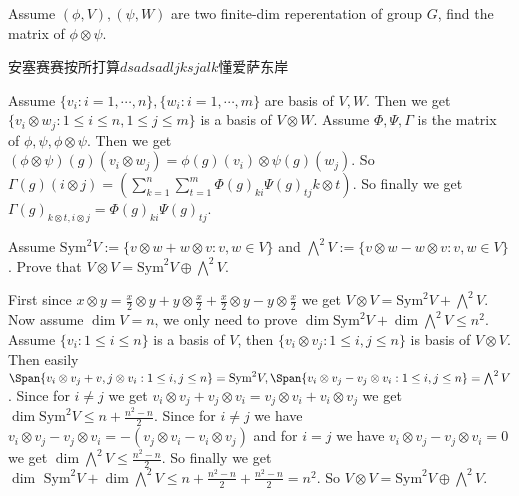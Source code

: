\documentclass{ctexart}
\newif\ifpreface
\begin{document}
\large
\setlength{\baselineskip}{1.2em}
\ifpreface
	
	\newgeometry{left=2cm,right=2cm,top=2cm,bottom=2cm}
\else
	\maketitle
\fi
\begin{problem}
Assume \((\phi,V),(\psi,W)\) are two finite-dim reperentation of group \(G\), find the matrix of \(\phi \otimes \psi\).
\end{problem}

安塞赛赛按所打算\(dsadsadljksjalk\)懂爱萨东岸\(\)\(\)\(\)\(\)
\begin{solution}
	Assume \(\{ v_i:i=1,\cdots,n\},\{ w_i:i=1,\cdots ,m\}\) are basis of \(V,W\). Then we get \(\{ v_i \otimes w_j:1 \leq i \leq n,1 \leq j \leq m\}\) is a basis of \(V \otimes W\).
	Assume \(\Phi,\Psi,\Gamma\) is the matrix of \(\phi,\psi,\phi \otimes \psi\).
	Then we get \(( \phi \otimes \psi)( g)( v_i \otimes w_j)=\phi( g)( v_i)\otimes \psi( g)( w_j)\).
	So \(\Gamma( g)( i \otimes j)=( \sum_{k=1}^{n}\sum_{t=1}^{m} \Phi( g)_{ki} \Psi( g)_{tj} k \otimes t)\).
	So finally we get \(\Gamma( g)_{k \otimes t,i \otimes j}=\Phi( g)_{ki}\Psi( g)_{tj}\).
\end{solution}

\begin{problem}
Assume \(\text{Sym}^2 V:=\{ v \otimes w + w \otimes v:v,w \in V\}\) and \(\bigwedge^2 V:=\{ v \otimes w - w \otimes v:v,w \in V\}\).
Prove that \(V \otimes V = \text{Sym}^2 V \oplus \bigwedge^2 V\).
\end{problem}

\begin{solution}
	First since \(x \otimes y = \frac{x}{2} \otimes y + y \otimes \frac{x}{2} + \frac{x}{2}\otimes y - y \otimes \frac{x}{2}\) we get \(V \otimes V = \text{Sym}^2 V + \bigwedge^2 V\).
	Now assume \(\dim V=n\), we only need to prove \(\dim\text{Sym}^2 V + \dim \bigwedge^2 V \leq n^2\).
	Assume \(\{ v_i:1 \leq i \leq n\}\) is a basis of \(V\), then \(\{v_i \otimes v_j:1 \leq i,j \leq n\}\) is basis of \(V \otimes V\).
	Then easily \(\Span\{ v_i \otimes v_j + v,j \otimes v_i:1 \leq i,j \leq n\}=\text{Sym}^2 V,\Span\{ v_i \otimes v_j - v_j \otimes v_i : 1 \leq i,j \leq n\}=\bigwedge^2 V\).
	Since for \(i \neq j\) we get \(v_i \otimes v_j+v_j \otimes v_i=v_j \otimes v_i + v_i \otimes v_j\) we get \(\dim \text{Sym}^2 V \leq n+\frac{n^2-n}{2}\).
	Since for \(i \neq j\) we have \(v_i \otimes v_j - v_j \otimes v_i = -( v_j \otimes v_i - v_i \otimes v_j)\) and for \(i = j \) we have \(v_i \otimes v_j - v_j \otimes v_i=0\) we get \(\dim \bigwedge^2 V \leq \frac{n^2-n}{2}\).
	So finally we get \(\dim \text{ Sym}^2 V +\dim \bigwedge^2 V \leq n+\frac{n^2-n}{2}+\frac{n^2-n}{2}=n^2\).
	So \(V \otimes V=\text{Sym}^2 V \oplus \bigwedge^2 V\).
\end{solution}
\end{document}
